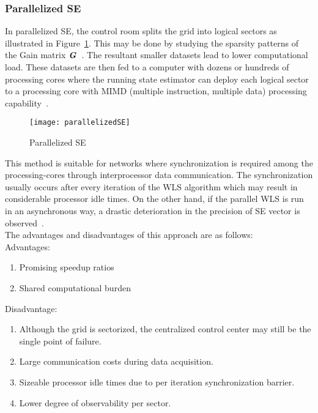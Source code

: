 \documentclass[thesis.tex]{subfiles}
\begin{document}
\subsubsection{Parallelized SE}
In parallelized SE, the control room splits the grid into logical sectors as illustrated in Figure~\ref{fig:parallelizedSE}. This may be done by studying the sparsity patterns of the Gain matrix $\textbf{\textit{G}}$~\cite{Abur}. The resultant smaller datasets lead to lower computational load. These datasets are then fed to a computer with dozens or hundreds of processing cores where the running state estimator can deploy each logical sector to a processing core with MIMD (multiple instruction, multiple data) processing capability~\cite{Abur}.
\begin{figure}[H]
	\centering
	\texttt{[image: parallelizedSE]}
	\caption{Parallelized SE}
	\label{fig:parallelizedSE}
\end{figure}
This method is suitable for networks where synchronization is required among the processing-cores through interprocessor data communication. The synchronization usually occurs after every iteration of the WLS algorithm which may result in considerable processor idle times. On the other hand, if the parallel WLS is run in an asynchronous way, a drastic deterioration in the precision of SE vector is observed~\cite{Carvalho}.\\The advantages and disadvantages of this approach are as follows:\\
Advantages:
\begin{enumerate}
	\item Promising speedup ratios 
	\item Shared computational burden
\end{enumerate}

Disadvantage:
\begin{enumerate}
	\item Although the grid is sectorized, the centralized control center may still be the single point of failure.
	\item Large communication costs during data acquisition.
	\item Sizeable processor idle times due to per iteration synchronization barrier.
	\item Lower degree of observability per sector.
\end{enumerate}
\end{document}
